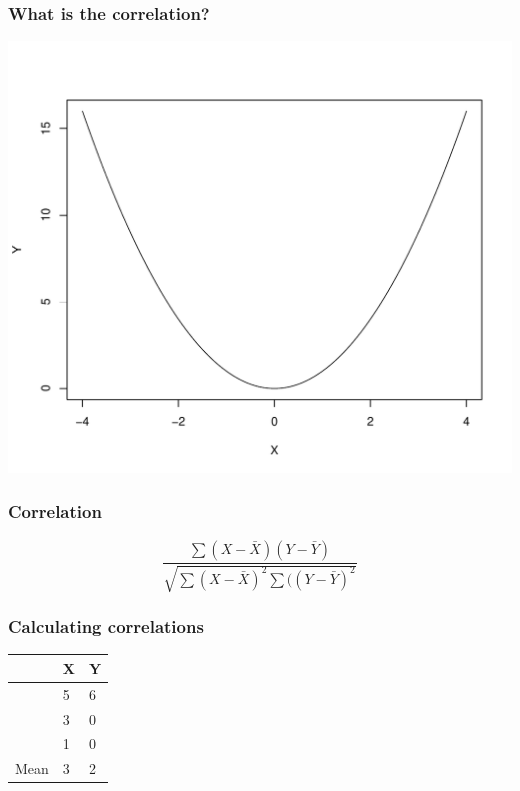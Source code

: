 \documentclass[dvipsnames]{beamer}\usepackage[]{graphicx}\usepackage[]{color}
\makeatletter
\def\maxwidth{ %
  \ifdim\Gin@nat@width>\linewidth
    \linewidth
  \else
    \Gin@nat@width
  \fi
}
\newenvironment{knitrout}{}{} %
\makeatother
\begin{document}
\begin{frame}
\frametitle{What is the correlation?}
\begin{knitrout}
\color{fgcolor}

{\centering \includegraphics[width=\maxwidth]{figure/unnamed-chunk-13-1} 

}



\end{knitrout}
\end{frame}

\begin{frame}
\frametitle{Correlation}
$$
\frac{\sum(X - \bar{X})(Y - \bar{Y})}{\sqrt{\sum(X - \bar{X})^2\sum((Y - \bar{Y})^2}}
$$
\end{frame}

\begin{frame}
\frametitle{Calculating correlations}
\begin{tabular}{lll}
\hline
&X	& Y \\
\hline
&5 &	6 \\
&3	&0 \\
&1	&0 \\
\hline
Mean &	3	&2 \\
\hline
\end{tabular}
\end{frame}
\end{document}
